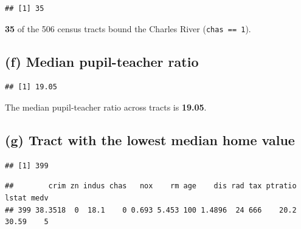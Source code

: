 \documentclass[
  11pt,
]{article}
\newenvironment{Shaded}{\begin{snugshade}}{\end{snugshade}}
\newcommand{\FunctionTok}[1]{\textcolor[rgb]{0.13,0.29,0.53}{\textbf{#1}}}
\newcommand{\NormalTok}[1]{#1}
\newcommand{\SpecialCharTok}[1]{\textcolor[rgb]{0.81,0.36,0.00}{\textbf{#1}}}
\begin{document}
\begin{verbatim}
## [1] 35
\end{verbatim}

\textbf{35} of the 506 census tracts bound the Charles River
(\texttt{chas\ ==\ 1}).

\subsection{(f) Median pupil-teacher
ratio}\label{f-median-pupil-teacher-ratio}

\begin{Shaded}
\end{Shaded}

\begin{verbatim}
## [1] 19.05
\end{verbatim}

The median pupil-teacher ratio across tracts is \textbf{19.05}.

\subsection{(g) Tract with the lowest median home
value}\label{g-tract-with-the-lowest-median-home-value}

\begin{Shaded}
\end{Shaded}

\begin{verbatim}
## [1] 399
\end{verbatim}

\begin{Shaded}
\end{Shaded}

\begin{verbatim}
##        crim zn indus chas   nox    rm age    dis rad tax ptratio lstat medv
## 399 38.3518  0  18.1    0 0.693 5.453 100 1.4896  24 666    20.2 30.59    5
\end{verbatim}
\end{document}
